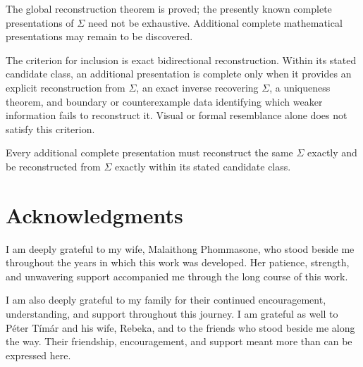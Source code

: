 The global reconstruction theorem is proved; the presently known complete
presentations of $\Sigma$ need not be exhaustive. Additional complete
mathematical presentations may remain to be discovered.

The criterion for inclusion is exact bidirectional reconstruction. Within its
stated candidate class, an additional presentation is complete only when it
provides an explicit reconstruction from $\Sigma$, an exact inverse recovering
$\Sigma$, a uniqueness theorem, and boundary or counterexample data identifying
which weaker information fails to reconstruct it. Visual or formal resemblance
alone does not satisfy this criterion.

Every additional complete presentation must reconstruct the same $\Sigma$
exactly and be reconstructed from $\Sigma$ exactly within its stated candidate
class.

\section*{Acknowledgments}

I am deeply grateful to my wife, Malaithong Phommasone, who stood beside me
throughout the years in which this work was developed. Her patience, strength,
and unwavering support accompanied me through the long course of this work.

I am also deeply grateful to my family for their continued encouragement,
understanding, and support throughout this journey. I am grateful as well to
P\'eter T\'im\'ar and his wife, Rebeka, and to the friends who stood beside me along
the way. Their friendship, encouragement, and support meant more than can be
expressed here.
